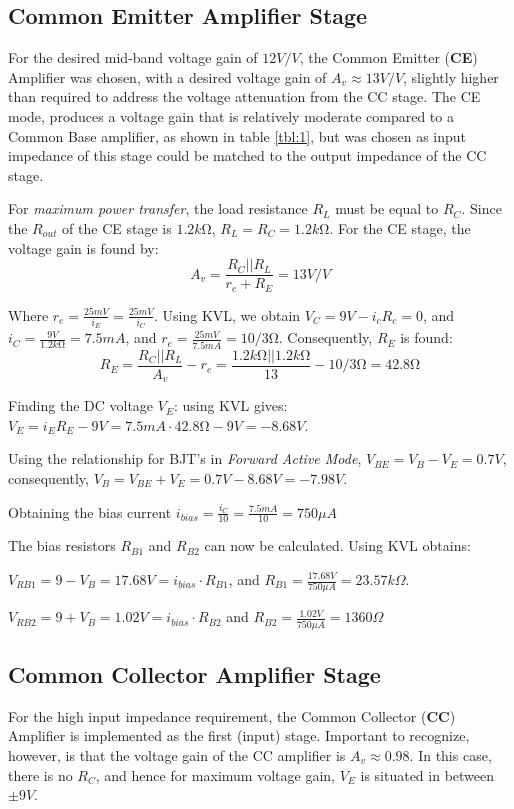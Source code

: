 \documentclass[12pt]{article}
\begin{document}
\subsection{Common Emitter Amplifier Stage}
For the desired mid-band voltage gain of $12V/V$, the Common Emitter (\textbf{CE}) Amplifier was chosen, with a desired voltage gain of $A_v \approx 13V/V$, slightly higher than required to address the voltage attenuation from the CC stage. The CE mode, produces a voltage gain that is relatively moderate compared to a Common Base amplifier, as shown in table \ref{tbl:1}, but was chosen as input impedance of this stage could be matched to the output impedance of the CC stage.

For \textit{maximum power transfer}, the load resistance $R_L$ must be equal to $R_C$. Since the $R_{out}$ of the CE stage is $1.2k\si{\ohm}$, $R_L = R_C = 1.2k\si{\ohm}$. For the CE stage, the voltage gain is found by:
$$A_v = \frac{R_C || R_L}{r_e + R_E} = 13V/V$$

Where $r_e = \frac{25mV}{i_E} = \frac{25mV}{i_C}$. Using KVL, we obtain $V_C = 9V - i_cR_c = 0$, and $i_C = \frac{9V}{1.2k\si{\ohm}} = 7.5mA$, and $r_e = \frac{25mV}{7.5mA} = 10/3\si{\ohm}$. Consequently, $R_E$ is found:
$$R_E = \frac{R_C||R_L}{A_v} - r_e = \frac{1.2k\si{\ohm} || 1.2k\si{\ohm}}{13} - 10/3\si{\ohm} = 42.8\si{\ohm}$$

Finding the DC voltage $V_E$: using KVL gives: $V_E = i_ER_E - 9V = 7.5mA \cdot 42.8\si{\ohm} - 9V = -8.68V$.

Using the relationship for BJT's in \textit{Forward Active Mode}, $V_{BE} = V_B - V_E = 0.7V$, consequently, $V_B = V_{BE} + V_E = 0.7V - 8.68V = -7.98V$.

Obtaining the bias current $i_{bias} = \frac{i_C}{10} = \frac{7.5mA}{10} = 750\mu A$

The bias resistors $R_{B1}$ and $R_{B2}$ can now be calculated.
Using KVL obtains: 

$V_{RB1} = 9 - V_B = 17.68V = i_{bias}\cdot R_{B1}$, and $R_{B1} =\frac{17.68V}{750\mu A } = 23.57k\Omega$.

$V_{RB2} = 9 + V_B = 1.02V = i_{bias}\cdot R_{B2}$ and $R_{B2} = \frac{1.02V}{750\mu A} = 1360\Omega$


\subsection{Common Collector Amplifier Stage}
For the high input impedance requirement, the Common Collector (\textbf{CC}) Amplifier is implemented as the first (input) stage. Important to recognize, however, is that the voltage gain of the CC amplifier is $A_v \approx 0.98$. In this case, there is no $R_C$, and hence for maximum voltage gain, $V_E$ is situated in between $\pm 9V$.
\end{document}

